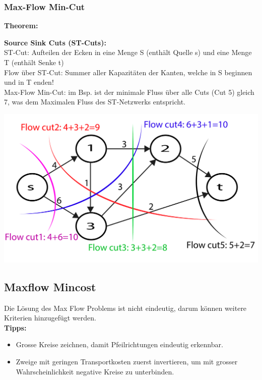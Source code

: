 \subsubsection{Max-Flow Min-Cut}
\textbf{Theorem:} 

\begin{minipage}{0.6\textwidth}
	\textbf{Source Sink Cuts (ST-Cuts):}\\
	
	ST-Cut: Aufteilen der Ecken in eine Menge S (enthält Quelle s) und eine Menge T (enthält Senke t)\\
	
	Flow über ST-Cut: Summer aller Kapazitäten der Kanten, welche in S beginnen und in T enden!\\
	
	Max-Flow Min-Cut: im Bsp. ist der minimale Fluss über alle Cuts (Cut 5) gleich 7, was dem Maximalen Fluss des ST-Netzwerks entspricht. 
\end{minipage}
\begin{minipage}{0.4\textwidth}
	\includegraphics[width=\textwidth]{Content/Graphen/StCuts.pdf}
\end{minipage}


\newpage
\subsection{Maxflow Mincost}
Die Lösung des Max Flow Problems ist nicht eindeutig, darum können weitere Kriterien hinzugefügt werden.\\

\textbf{Tipps:}
\begin{itemize}
\item Grosse Kreise zeichnen, damit Pfeilrichtungen eindeutig erkennbar.
\item Zweige mit geringen Transportkosten zuerst invertieren, um mit grosser Wahrscheinlichkeit negative Kreise zu unterbinden.
\end{itemize} 

